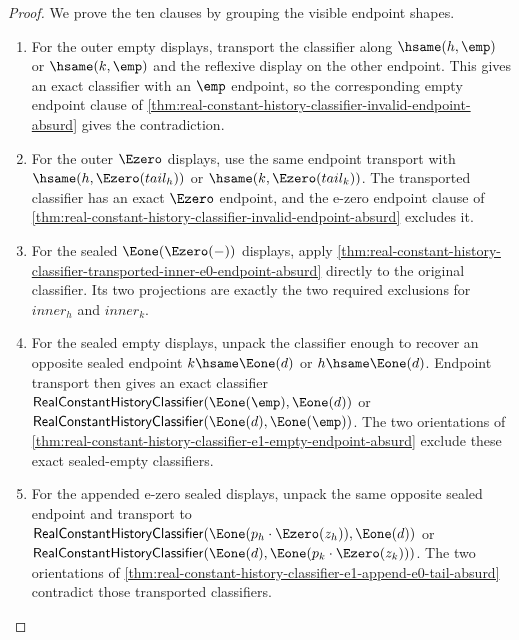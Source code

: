 \begin{proof}
We prove the ten clauses by grouping the visible endpoint shapes.

\begin{enumerate}
  \item For the outer empty displays, transport the classifier along
  $\hsame(h,\emp)$ or $\hsame(k,\emp)$ and the reflexive display on the other
  endpoint. This gives an exact classifier with an $\emp$ endpoint, so the
  corresponding empty endpoint clause of
  \autoref{thm:real-constant-history-classifier-invalid-endpoint-absurd}
  gives the contradiction.

  \item For the outer $\Ezero$ displays, use the same endpoint transport with
  $\hsame(h,\Ezero(tail_h))$ or $\hsame(k,\Ezero(tail_k))$. The transported
  classifier has an exact $\Ezero$ endpoint, and the e-zero endpoint clause of
  \autoref{thm:real-constant-history-classifier-invalid-endpoint-absurd}
  excludes it.

  \item For the sealed $\Eone(\Ezero(-))$ displays, apply
  \autoref{thm:real-constant-history-classifier-transported-inner-e0-endpoint-absurd}
  directly to the original classifier. Its two projections are exactly the
  two required exclusions for $inner_h$ and $inner_k$.

  \item For the sealed empty displays, unpack the classifier enough to recover
  an opposite sealed endpoint $k\hsame\Eone(d)$ or $h\hsame\Eone(d)$. Endpoint
  transport then gives an exact classifier
  $\mathsf{RealConstantHistoryClassifier}(\Eone(\emp),\Eone(d))$ or
  $\mathsf{RealConstantHistoryClassifier}(\Eone(d),\Eone(\emp))$. The two
  orientations of
  \autoref{thm:real-constant-history-classifier-e1-empty-endpoint-absurd}
  exclude these exact sealed-empty classifiers.

  \item For the appended e-zero sealed displays, unpack the same opposite
  sealed endpoint and transport to
  $\mathsf{RealConstantHistoryClassifier}
  (\Eone(p_h\cdot\Ezero(z_h)),\Eone(d))$ or
  $\mathsf{RealConstantHistoryClassifier}
  (\Eone(d),\Eone(p_k\cdot\Ezero(z_k)))$. The two orientations of
  \autoref{thm:real-constant-history-classifier-e1-append-e0-tail-absurd}
  contradict those transported classifiers.
\end{enumerate}
\end{proof}

